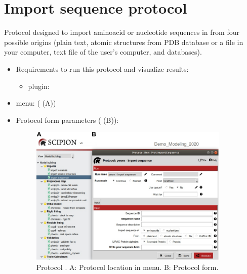 \section{Import sequence protocol}
\label{app:importSequence}%
Protocol designed to import aminoacid or nucleotide sequences in \scipion from four possible origins (plain text, atomic structures from PDB database or a file in your computer, text file of the user's computer, and  databases).

\begin{itemize}
  \item Requirements to run this protocol and visualize results:
    \begin{itemize}
        \item \scipion plugin: 
    \end{itemize}
  \item \scipion menu:
   ( (A))
  
  \item Protocol form parameters ( (B)):
  
  \begin{figure}[H]
    \centering 
    \captionsetup{width=.9\linewidth} 
    \includegraphics[width=0.90\textwidth]{Images_appendix/Fig104.pdf}
    \caption{Protocol . A: Protocol location in \scipion menu. B: Protocol form.}
    \label{fig:app_protocol_sequence_1}
   \end{figure}
  

\end{itemize}

